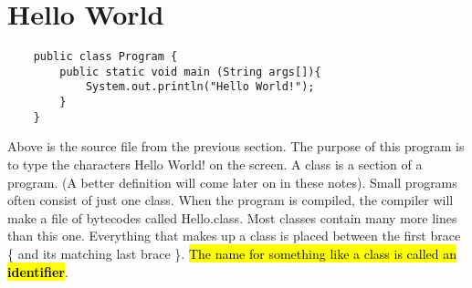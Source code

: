 \documentclass[Main.tex]{subfiles}
\begin{document}
\section{Hello World}
    \begin{lstlisting}
    public class Program {
        public static void main (String args[]){
            System.out.println("Hello World!");
        }
    }\end{lstlisting}
    Above is the source file from the previous section. The purpose of this program is to type the
characters Hello World! on the screen.
    A class is a section of a program. (A better definition will come later on in these notes). Small programs often
consist of just one class. When the program is compiled, the compiler will make a file of bytecodes called
Hello.class. Most classes contain many more lines than this one. Everything that makes up a class is placed between the
first brace \{ and its matching last brace  \}.
    \hl{The name for something like a class is called an \textbf{identifier}}.
\end{document}
